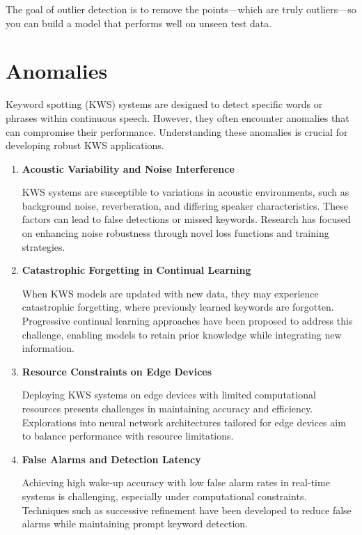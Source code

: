 The goal of outlier detection is to remove the points—which are truly
outliers—so you can build a model that performs well on unseen test
data.\cite{C:2022}

\section{Anomalies}


Keyword spotting (KWS) systems are designed to detect specific words or phrases within continuous speech. However, they often encounter anomalies that can compromise their performance. Understanding these anomalies is crucial for developing robust KWS applications.

\newpage
\begin{enumerate}
	\item \textbf{Acoustic Variability and Noise Interference}
	
	KWS systems are susceptible to variations in acoustic environments, such as background noise, reverberation, and differing speaker characteristics. These factors can lead to false detections or missed keywords. Research has focused on enhancing noise robustness through novel loss functions and training strategies. \cite{Lopez:2021}
	
	\item \textbf{Catastrophic Forgetting in Continual Learning}
	
	When KWS models are updated with new data, they may experience catastrophic forgetting, where previously learned keywords are forgotten. Progressive continual learning approaches have been proposed to address this challenge, enabling models to retain prior knowledge while integrating new information. \cite{Huang:2022}
	
	\item \textbf{Resource Constraints on Edge Devices}
	
	Deploying KWS systems on edge devices with limited computational resources presents challenges in maintaining accuracy and efficiency. Explorations into neural network architectures tailored for edge devices aim to balance performance with resource limitations. \cite{Bushur:2023}
	
	\item \textbf{False Alarms and Detection Latency}
	
	Achieving high wake-up accuracy with low false alarm rates in real-time systems is challenging, especially under computational constraints. Techniques such as successive refinement have been developed to reduce false alarms while maintaining prompt keyword detection. \cite{Saidutta:2023}
	

\end{enumerate}
